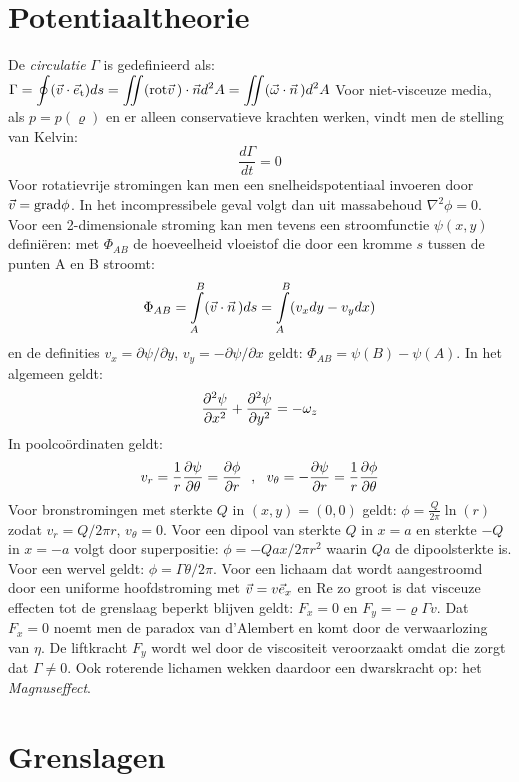 \section{Potentiaaltheorie}
De {\it circulatie} $\Gamma$ is gedefinieerd als:
$\displaystyle
\Gamma=\oint(\vec{v}\cdot\vec{e}_{\rm t})ds=\int\hspace{-1.5ex}\int({\rm rot}\vec{v}\,)\cdot\vec{n}d^2A=\int\hspace{-1.5ex}\int(\vec{\omega}\cdot\vec{n}\,)d^2A
$
\npar
Voor niet-visceuze media, als $p=p(\varrho)$ en er alleen conservatieve
krachten werken, vindt men de stelling van Kelvin:
\[
\frac{d\Gamma}{dt}=0
\]
Voor rotatievrije stromingen kan men een snelheidspotentiaal invoeren door
$\vec{v}={\rm grad}\phi$. In het incompressibele geval volgt dan uit massabehoud
$\nabla^2\phi=0$. Voor een 2-dimensionale stroming kan men tevens een
stroomfunctie $\psi(x,y)$ defini\"eren: met $\Phi_{AB}$ de hoeveelheid
vloeistof die door een kromme $s$ tussen de punten A en B stroomt:
\[
\Phi_{AB}=\int\limits_A^B (\vec{v}\cdot\vec{n}\,)ds=\int\limits_A^B(v_xdy-v_ydx)
\]
en de definities $v_x=\partial\psi/\partial y$, $v_y=-\partial\psi/\partial x$
geldt: $\Phi_{AB}=\psi(B)-\psi(A)$. In het algemeen geldt:
\[
\frac{\partial^2 \psi}{\partial x^2}+\frac{\partial^2 \psi}{\partial y^2}=-\omega_z
\]
In poolco\"ordinaten geldt:
\[
v_r=\frac{1}{r}\frac{\partial \psi}{\partial \theta}=\frac{\partial \phi}{\partial r}~~,~~
v_\theta=-\frac{\partial \psi}{\partial r}=\frac{1}{r}\frac{\partial \phi}{\partial \theta}
\]
Voor bronstromingen met sterkte $Q$ in $(x,y)=(0,0)$ geldt:
$\displaystyle\phi=\frac{Q}{2\pi}\ln(r)$ zodat $v_r=Q/2\pi r$, $v_\theta=0$.
\npar
Voor een dipool van sterkte $Q$ in $x=a$ en sterkte $-Q$ in $x=-a$ volgt door
superpositie: $\displaystyle\phi=-Qax/2\pi r^2$ waarin $Qa$ de dipoolsterkte
is. Voor een wervel geldt: $\phi=\Gamma\theta/2\pi$.
\npar
Voor een lichaam dat wordt aangestroomd door een uniforme hoofdstroming met
$\vec{v}=v\vec{e}_x$ en Re zo groot is dat visceuze effecten tot de grenslaag
beperkt blijven geldt: $F_x=0$ en $F_y=-\varrho\Gamma v$. Dat $F_x=0$ noemt
men de paradox van d'Alembert en komt door de verwaarlozing van $\eta$. De
liftkracht $F_y$ wordt wel door de viscositeit veroorzaakt omdat die zorgt
dat $\Gamma\neq0$. Ook roterende lichamen wekken daardoor een dwarskracht op:
het {\it Magnuseffect}.

\section{Grenslagen}
